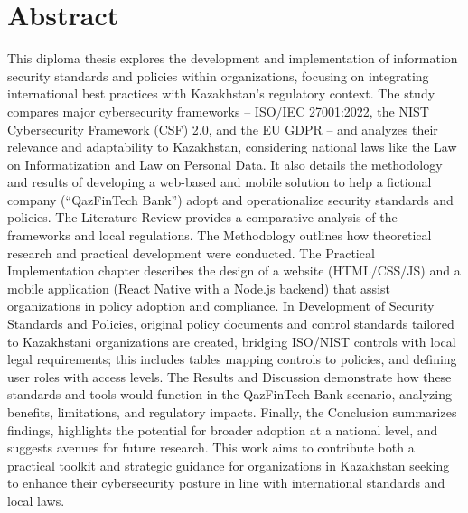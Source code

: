 %
%
\chapter{Abstract}
\begin{SingleSpace}
\noindent\hspace{2em}This diploma thesis explores the development and implementation of information security standards and policies within organizations, focusing on integrating international best practices with Kazakhstan’s regulatory context. The study compares major cybersecurity frameworks – ISO/IEC 27001:2022, the NIST Cybersecurity Framework (CSF) 2.0, and the EU GDPR – and analyzes their relevance and adaptability to Kazakhstan, considering national laws like the Law on Informatization and Law on Personal Data. It also details the methodology and results of developing a web-based and mobile solution to help a fictional company (“QazFinTech Bank”) adopt and operationalize security standards and policies. The Literature Review provides a comparative analysis of the frameworks and local regulations. The Methodology outlines how theoretical research and practical development were conducted. The Practical Implementation chapter describes the design of a website (HTML/CSS/JS) and a mobile application (React Native with a Node.js backend) that assist organizations in policy adoption and compliance. In Development of Security Standards and Policies, original policy documents and control standards tailored to Kazakhstani organizations are created, bridging ISO/NIST controls with local legal requirements; this includes tables mapping controls to policies, and defining user roles with access levels. The Results and Discussion demonstrate how these standards and tools would function in the QazFinTech Bank scenario, analyzing benefits, limitations, and regulatory impacts. Finally, the Conclusion summarizes findings, highlights the potential for broader adoption at a national level, and suggests avenues for future research. This work aims to contribute both a practical toolkit and strategic guidance for organizations in Kazakhstan seeking to enhance their cybersecurity posture in line with international standards and local laws.


\end{SingleSpace}
